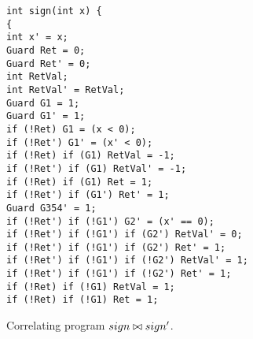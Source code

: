 \begin{figure}
\centering
\begin{lstlisting}
int sign(int x) {
{
int x' = x;
Guard Ret = 0;
Guard Ret' = 0;
int RetVal;
int RetVal' = RetVal;
Guard G1 = 1;
Guard G1' = 1;
if (!Ret) G1 = (x < 0);
if (!Ret') G1' = (x' < 0);
if (!Ret) if (G1) RetVal = -1;
if (!Ret') if (G1) RetVal' = -1;
if (!Ret) if (G1) Ret = 1;
if (!Ret') if (G1') Ret' = 1;
Guard G354' = 1;
if (!Ret') if (!G1') G2' = (x' == 0);
if (!Ret') if (!G1') if (G2') RetVal' = 0;
if (!Ret') if (!G1') if (G2') Ret' = 1;
if (!Ret') if (!G1') if (!G2') RetVal' = 1;
if (!Ret') if (!G1') if (!G2') Ret' = 1;
if (!Ret) if (!G1) RetVal = 1;
if (!Ret) if (!G1) Ret = 1;
\end{lstlisting}
\caption{Correlating program $sign \bowtie sign'$.}
\end{figure}
